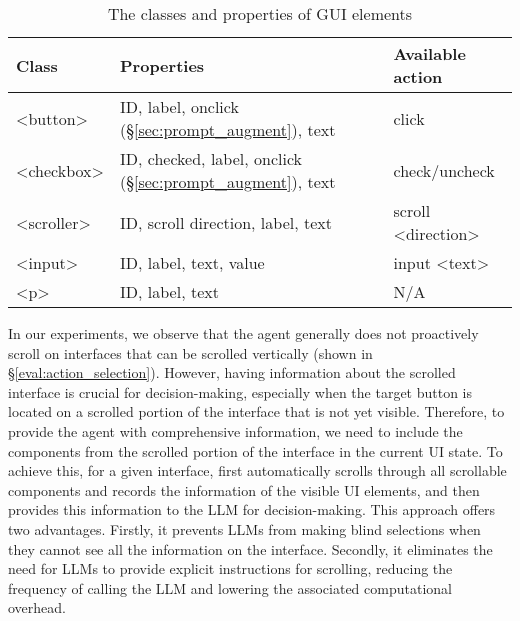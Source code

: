 \begin{table}
	\caption{The classes and properties of GUI elements}
	\vspace{-0.3cm}
	\centering
        \resizebox{.47\textwidth}{!}
        {
	\begin{tabular}{lll}
		\toprule
		 Class                     & Properties                                        & Available action\\
		\midrule
		<button>                & ID, label, onclick (\S\ref{sec:prompt_augment}), text                      & click \\
		<checkbox>              & ID, checked, label, onclick (\S\ref{sec:prompt_augment}), text              & check/uncheck\\
		<scroller>              & ID, scroll direction, label, text     & scroll <direction>\\
		<input>                 & ID, label, text, value                & input <text>\\
		<p>                     & ID, label, text                       & N/A\\  
		\bottomrule
	\end{tabular}
 }
	\label{tab:element_properties}
     \vspace{-0.5cm}
\end{table}     

In our experiments, we observe that the agent generally does not proactively scroll on interfaces that can be scrolled vertically (shown in \S \ref{eval:action_selection}). However, having information about the scrolled interface is crucial for decision-making, especially when the target button is located on a scrolled portion of the interface that is not yet visible. Therefore, to provide the agent with comprehensive information, we need to include the components from the scrolled portion of the interface in the current UI state. 
To achieve this, for a given interface, \name first automatically scrolls through all scrollable components and records the information of the visible UI elements, and then provides this information to the LLM for decision-making. This approach offers two advantages. Firstly, it prevents LLMs from making blind selections when they cannot see all the information on the interface. Secondly, it eliminates the need for LLMs to provide explicit instructions for scrolling, reducing the frequency of calling the LLM and lowering the associated computational overhead.


